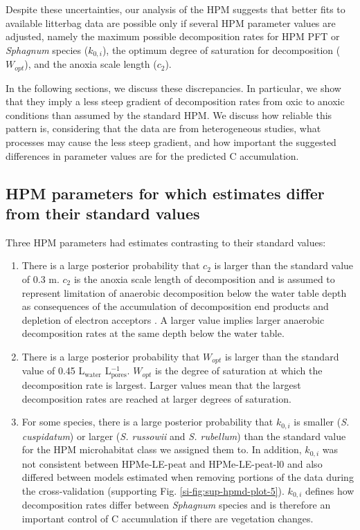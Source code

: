 \documentclass[esd, manuscript]{copernicus}
\begin{document}
Despite these uncertainties, our analysis of the HPM suggests that better fits to available litterbag data are possible only if several HPM parameter values are adjusted, namely the maximum possible decomposition rates for HPM PFT or \emph{Sphagnum} species (\(k_{0,i}\)), the optimum degree of saturation for decomposition (\(W_{opt}\)), and the anoxia scale length (\(c_2\)).

In the following sections, we discuss these discrepancies. In particular, we show that they imply a less steep gradient of decomposition rates from oxic to anoxic conditions than assumed by the standard HPM. We discuss how reliable this pattern is, considering that the data are from heterogeneous studies, what processes may cause the less steep gradient, and how important the suggested differences in parameter values are for the predicted C accumulation.

\hypertarget{out-discussion-1}{%
\subsection{HPM parameters for which estimates differ from their standard values}\label{out-discussion-1}}

Three HPM parameters had estimates contrasting to their standard values:

\begin{enumerate}
\def\labelenumi{\arabic{enumi}.}
\item
  There is a large posterior probability that \(c_2\) is larger than the standard value of 0.3 m. \(c_2\) is the anoxia scale length of decomposition and is assumed to represent limitation of anaerobic decomposition below the water table depth as consequences of the accumulation of decomposition end products and depletion of electron acceptors \citep{Frolking.2010}. A larger value implies larger anaerobic decomposition rates at the same depth below the water table.
\item
  There is a large posterior probability that \(W_{opt}\) is larger than the standard value of 0.45 L\(_\text{water}\) L\(_\text{pores}^{-1}\). \(W_{opt}\) is the degree of saturation at which the decomposition rate is largest. Larger values mean that the largest decomposition rates are reached at larger degrees of saturation.
\item
  For some species, there is a large posterior probability that \(k_{0,i}\) is smaller (\emph{S. cuspidatum}) or larger (\emph{S. russowii} and \emph{S. rubellum}) than the standard value for the HPM microhabitat class we assigned them to. In addition, \(k_{0,i}\) was not consistent between HPMe-LE-peat and HPMe-LE-peat-l0 and also differed between models estimated when removing portions of the data during the cross-validation (supporting Fig. \ref{si-fig:sup-hpmd-plot-5}). \(k_{0,i}\) defines how decomposition rates differ between \emph{Sphagnum} species and is therefore an important control of C accumulation if there are vegetation changes.
\end{enumerate}
\end{document}
